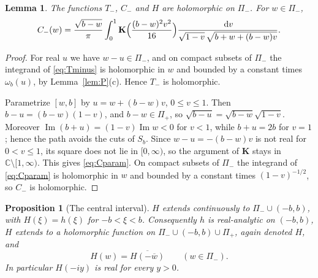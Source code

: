 \documentclass[11pt]{amsart}
\numberwithin{equation}{section}
\newtheorem{proposition}[theorem]{Proposition}
\newtheorem{lemma}[theorem]{Lemma}
\theoremstyle{definition}
\theoremstyle{remark}
\newcommand{\C}{\mathbb{C}}
\newcommand{\Pim}{\Pi_{-}}
\newcommand{\Pip}{\Pi_{+}}
\newcommand{\dd}{\,\mathrm{d}}
\DeclareMathOperator{\im}{Im}
\newcommand{\Kc}{\mathbf{K}}
\begin{document}
\begin{lemma}\label{lem:holo}
The functions $T_-$, $C_-$ and $H$ are holomorphic on $\Pim$. For $w\in\Pim$,
\begin{equation}\label{eq:Cparam}
C_-(w)=\frac{\sqrt{b-w}}{\pi}\int_0^1\Kc\Bigl(\frac{(b-w)^2v^2}{16}\Bigr)
\frac{\dd v}{\sqrt{1-v}\,\sqrt{b+w+(b-w)v}} .
\end{equation}
\end{lemma}

\begin{proof}
For real $u$ we have $w-u\in\Pim$, and on compact subsets of $\Pim$ the
integrand of \eqref{eq:Tminus} is holomorphic in $w$ and bounded by a constant
times $\omega_b(u)$, by Lemma~\ref{lem:P}(c). Hence $T_-$ is holomorphic.

Parametrize $[w,b]$ by $u=w+(b-w)v$, $0\le v\le1$. Then $b-u=(b-w)(1-v)$, and
$b-w\in\Pip$, so $\sqrt{b-u}=\sqrt{b-w}\sqrt{1-v}$. Moreover
$\im(b+u)=(1-v)\im w<0$ for $v<1$, while $b+u=2b$ for $v=1$; hence the path
avoids the cuts of $S_b$. Since $w-u=-(b-w)v$ is not real for $0<v\le1$, its
square does not lie in $[0,\infty)$, so the argument of $\Kc$ stays in
$\C\setminus[1,\infty)$. This gives \eqref{eq:Cparam}. On compact subsets of
$\Pim$ the integrand of \eqref{eq:Cparam} is holomorphic in $w$ and bounded by
a constant times $(1-v)^{-1/2}$, so $C_-$ is holomorphic.
\end{proof}

\begin{proposition}[The central interval]\label{prop:central}
$H$ extends continuously to $\Pim\cup(-b,b)$, with $H(\xi)=h(\xi)$ for
$-b<\xi<b$. Consequently $h$ is real-analytic on $(-b,b)$, $H$ extends to a
holomorphic function on $\Pim\cup(-b,b)\cup\Pip$, again denoted $H$, and
\begin{equation}\label{eq:Hsym}
H(w)=\overline{H(-\overline w)}\qquad(w\in\Pim).
\end{equation}
In particular $H(-iy)$ is real for every $y>0$.
\end{proposition}
\end{document}

